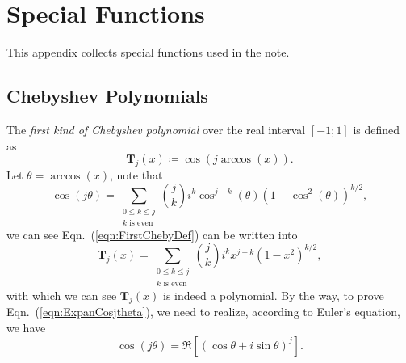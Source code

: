 \section{Special Functions}
\renewcommand{\theequation}{\thesection.\arabic{equation}}
\setcounter{equation}{0}
This appendix collects special functions used in the note.


\subsection{Chebyshev Polynomials}\label{subsec:Cheby}
The \textit{first kind of Chebyshev polynomial} over the real interval $[-1;1]$ is defined as 
\begin{equation}
    \textbf{T}_j(x)\coloneqq\cos (j \arccos(x)).
    \label{eqn:FirstChebyDef}
\end{equation}
Let $\theta=\arccos(x)$, note that
\begin{equation}
    \cos(j\theta)=\sum_{\substack{0 \le k \le j \\ k \text{ is even}}}\binom{j}{k}i^k\cos^{j-k}(\theta)(1-\cos^2(\theta))^{k/2},
    \label{eqn:ExpanCosjtheta}
\end{equation}
 we can see Eqn.~(\ref{eqn:FirstChebyDef}) can be written into
 \begin{equation}
    \textbf{T}_j(x)=\sum_{\substack{0 \le k \le j \\ k \text{ is even}}}\binom{j}{k}i^k x^{j-k}(1-x^2)^{k/2},
    \label{eqn:FirtChebExpansionForm}
 \end{equation}
 with which we can see $\textbf{T}_j(x)$ is indeed a polynomial. By the way, to prove Eqn.~(\ref{eqn:ExpanCosjtheta}), we need to realize, according to Euler's equation, we have 
 \begin{equation}
    \cos(j\theta)=\Re[(\cos\theta+i\sin\theta)^j].
 \end{equation}

